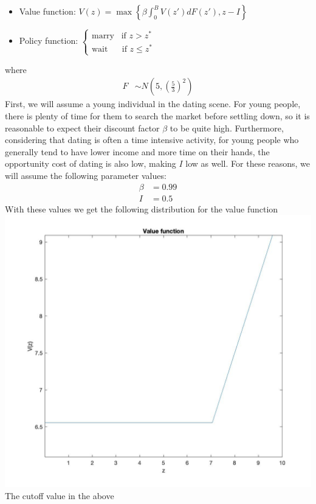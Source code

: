 \documentclass[
]{article}
\begin{document}
\begin{itemize} 
\item Value function: $V(z)=\max\left\{ \beta \int_0^B V(z')dF(z'), z - I \right\}$
\item Policy function: $\begin{cases} \text{marry} \;\;\; \text{if } z > z^* \\\text{wait} \;\;\;\;\: \text{ if } z \le z^*\end{cases}$
\end{itemize}

where \[\begin{aligned} F&\sim N(5, (\frac{5}{3})^2)\end{aligned}\]
First, we will assume a young individual in the dating scene. For young
people, there is plenty of time for them to search the market before
settling down, so it is reasonable to expect their discount factor
\(\beta\) to be quite high. Furthermore, considering that dating is
often a time intensive activity, for young people who generally tend to
have lower income and more time on their hands, the opportunity cost of
dating is also low, making \(I\) low as well. For these reasons, we will
assume the following parameter values: \[\begin{aligned} \beta&= 0.99\\
I &= 0.5
\end{aligned}\] With these values we get the following distribution for
the value function\\
\includegraphics{images/datingvalfunc.jpg} The cutoff value in the above
\end{document}
